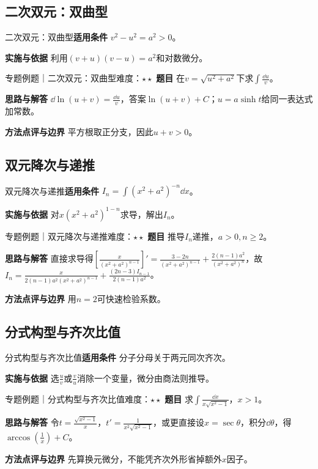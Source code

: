 \subsection{二次双元：双曲型}\label{mat:integrals_methods:i16}
\begin{method}{二次双元：双曲型}\textbf{适用条件} $v^2-u^2=a^2>0$。\par\textbf{实施与依据} 利用$(v+u)(v-u)=a^2$和对数微分。\end{method}
\begin{example}{专题例题｜二次双元：双曲型}{难度：$\star\star$}
\textbf{题目} 在$v=\sqrt{u^2+a^2}$下求$\int\frac{\dd u}{v}$。\par\textbf{思路与解答} $\dd\ln(u+v)=\frac{\dd u}{v}$，答案$\ln(u+v)+C$；$u=a\sinh t$给同一表达式加常数。\par\textbf{方法点评与边界} 平方根取正分支，因此$u+v>0$。
\end{example}
\subsection{双元降次与递推}\label{mat:integrals_methods:i17}
\begin{method}{双元降次与递推}\textbf{适用条件} $I_n=\int(x^2+a^2)^{-n}\dd x$。\par\textbf{实施与依据} 对$x(x^2+a^2)^{1-n}$求导，解出$I_n$。\end{method}
\begin{example}{专题例题｜双元降次与递推}{难度：$\star\star$}
\textbf{题目} 推导$I_n$递推，$a>0,n\ge2$。\par\textbf{思路与解答} 直接求导得$[\frac{x}{(x^2+a^2)^{n-1}}]\prime=\frac{3-2n}{(x^2+a^2)^{n-1}}+\frac{2(n-1)a^2}{(x^2+a^2)^n}$，故$I_n=\frac{x}{2(n-1)a^2(x^2+a^2)^{n-1}}+\frac{(2n-3)I_{n-1}}{2(n-1)a^2}$。\par\textbf{方法点评与边界} 用$n=2$可快速检验系数。
\end{example}
\subsection{分式构型与齐次比值}\label{mat:integrals_methods:i18}
\begin{method}{分式构型与齐次比值}\textbf{适用条件} 分子分母关于两元同次齐次。\par\textbf{实施与依据} 选$\frac{u}{v}$或$\frac{v}{u}$消除一个变量，微分由商法则推导。\end{method}
\begin{example}{专题例题｜分式构型与齐次比值}{难度：$\star\star$}
\textbf{题目} 求$\int\frac{\dd x}{x\sqrt{x^2-1}}$，$x>1$。\par\textbf{思路与解答} 令$t=\frac{\sqrt{x^2-1}}{x}$，$t\prime=\frac{1}{x^2\sqrt{x^2-1}}$，或更直接设$x=\sec\theta$，积分$\dd\theta$，得$\arccos(\frac{1}{x})+C$。\par\textbf{方法点评与边界} 先算换元微分，不能凭齐次外形省掉额外$x$因子。
\end{example}

